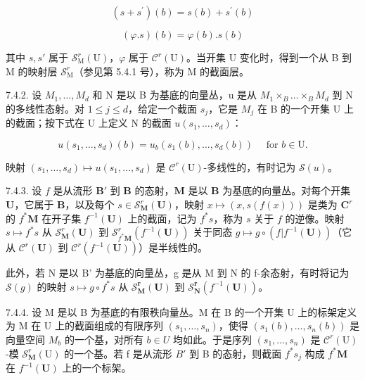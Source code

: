 \[
(s + s ^ {\prime}) (b) = s (b) + s ^ {\prime} (b)\tag{2}
\]

\[
(\varphi . s) (b) = \varphi (b). s (b)
\]

其中 \(s, s'\) 属于 \(\mathcal{S}_{\mathrm{M}}^{r}(\mathrm{U})\)，\(\varphi\) 属于 \(\mathcal{C}^{r}(\mathrm{U})\)。当开集 U 变化时，得到一个从 B 到 M 的映射层 \(\mathcal{S}_{\mathrm{M}}^{r}\)（参见第 5.4.1 号），称为 M 的截面层。

7.4.2. 设 \(M_{1},\ldots,M_{d}\) 和 N 是以 B 为基底的向量丛，u 是从 \(M_{1}\times_{B}\ldots\times_{B}M_{d}\) 到 N 的多线性态射。对 \(1\leqslant j\leqslant d\)，给定一个截面 \(s_{j}\)，它是 \(M_{j}\) 在 B 的一个开集 U 上的截面；按下式在 U 上定义 N 的截面 \(u(s_{1},\ldots,s_{d})\)：

\[
u (s _ {1}, \dots , s _ {d}) (b) = u _ {b} (s _ {1} (b), \dots , s _ {d} (b)) \quad \text {   for   } b \in \mathrm{U}.
\]

映射 \((s_1, \ldots, s_d) \mapsto u(s_1, \ldots, s_d)\) 是 \(\mathcal{C}^r(\mathrm{U})\)-多线性的，有时记为 \(\mathcal{S}(u)\)。

7.4.3. 设 \(f\) 是从流形 \(\mathbf{B}'\) 到 \(\mathbf{B}\) 的态射，\(\mathbf{M}\) 是以 \(\mathbf{B}\) 为基底的向量丛。对每个开集 \(\mathbf{U}\)，它属于 \(\mathbf{B}\)，以及每个 \(s \in \mathcal{S}_{\mathbf{M}}^{r}(\mathbf{U})\)，映射 \(x \mapsto (x, s(f(x)))\) 是类为 \(\mathbf{C}^r\) 的 \(f^{*}\mathbf{M}\) 在开子集 \(f^{-1}(\mathbf{U})\) 上的截面，记为 \(f^{*}s\)，称为 \(s\) 关于 \(f\) 的逆像。映射 \(s \mapsto f^{*}s\) 从 \(\mathcal{S}_{\mathbf{M}}^{r}(\mathbf{U})\) 到 \(\mathcal{S}_{f^{*}\mathbf{M}}^{r}(f^{-1}(\mathbf{U}))\) 关于同态 \(g \mapsto g \circ (f|f^{-1}(\mathbf{U}))\)（它从 \(\mathcal{C}^{r}(\mathbf{U})\) 到 \(\mathcal{C}^{r}(f^{-1}(\mathbf{U}))\)）是半线性的。

此外，若 N 是以 B' 为基底的向量丛，g 是从 M 到 N 的 f-余态射，有时将记为 \(\mathcal{S}(g)\) 的映射 \(s \mapsto g \circ f^{*}s\) 从 \(\mathcal{S}_{\mathbf{M}}^{\mathbf{r}}(\mathbf{U})\) 到 \(\mathcal{S}_{\mathbf{N}}^{\mathbf{r}}(f^{-1}(\mathbf{U}))\)。

7.4.4. 设 M 是以 B 为基底的有限秩向量丛。M 在 B 的一个开集 U 上的标架定义为 M 在 U 上的截面组成的有限序列 \((s_{1},\ldots,s_{n})\)，使得 \((s_{1}(b),\ldots,s_{n}(b))\) 是向量空间 \(M_{b}\) 的一个基，对所有 \(b\in U\) 均如此。于是序列 \((s_{1},\ldots,s_{n})\) 是 \(\mathcal{C}^{r}(\mathrm{U})\)-模 \(\mathcal{S}_{\mathbf{M}}^{r}(\mathrm{U})\) 的一个基。若 f 是从流形 \(B'\) 到 B 的态射，则截面 \(f^{*}s_{j}\) 构成 \(f^{*}\mathbf{M}\) 在 \(f^{-1}(\mathbf{U})\) 上的一个标架。


